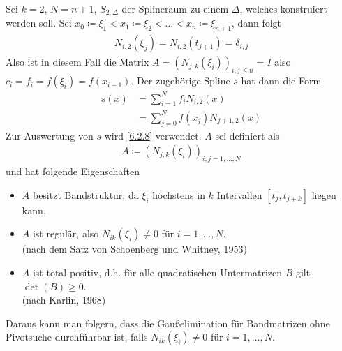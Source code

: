 \label{6.2.14}
Sei $k=2$, $N=n+1$, $S_{2,\Delta}$ der Splineraum zu einem $\Delta$,
welches konstruiert werden soll.
\label{im6.2.14}
Sei $x_0\coloneqq \xi_1<x_1\coloneqq \xi_2<\dots<x_n\coloneqq
\xi_{n+1}$, dann folgt
\begin{gather*}
  N_{i,2}(\xi_j)=N_{i,2}(t_{j+1})=\delta_{i,j}
\end{gather*}
Also ist in diesem Fall die Matrix $A=(N_{j,k}(\xi_i))_{i,j\leq n}=I$
also $c_i=f_i=f(\xi_i)=f(x_{i-1})$.
Der zugehörige Spline $s$ hat dann die Form
\begin{align*}
  s(x) &= \sum_{i=1}^{N}f_i N_{i,2}(x) \\
       &= \sum_{j=0}^{N}f(x_j)N_{j+1,2}(x)
\end{align*}
Zur Auswertung von $s$ wird \ref{6.2.8} verwendet.
$A$ sei definiert als
\begin{gather*}
  A \coloneqq \left(N_{j,k}(\xi_i)\right)_{i,j=1,\ldots,N}
\end{gather*}
und hat folgende Eigenschaften
\begin{itemize}
\item  $A$ besitzt Bandstruktur, da  $\xi_i$ höchstens in $k$
  Intervallen $[t_j, t_{j+k}]$ liegen kann.
\item $A$ ist regulär, also $N_{ik}(\xi_i)\neq 0$
  für $i=1, \ldots, N$.\\
  (nach dem Satz von Schoenberg und Whitney, 1953)
\item $A$ ist total positiv, d.h. für alle quadratischen
  Untermatrizen $B$ gilt $\det(B)\geq 0$.\\    
  (nach Karlin, 1968)
\end{itemize}

Daraus kann man folgern, dass
die Gaußelimination für Bandmatrizen ohne Pivotsuche
durchführbar ist, falls $N_{ik}(\xi_i) \neq 0$
für $i =1, \ldots, N$.\\


